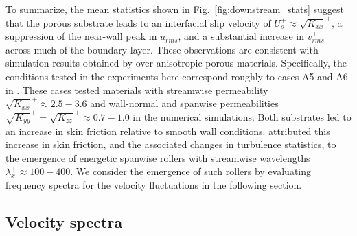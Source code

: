 \documentclass[letterpaper,11pt]{article}
\newcommand{\kpxx}{\sqrt{K_{xx}}^+}
\newcommand{\kpyy}{\sqrt{K_{yy}}^+}
\newcommand{\kpzz}{\sqrt{K_{zz}}^+}
\begin{document}
To summarize, the mean statistics shown in Fig.~\ref{fig:downstream_stats} suggest that the porous substrate leads to an interfacial slip velocity of $U_s^+ \approx \kpxx$, a suppression of the near-wall peak in $u_{rms}^+$, and a substantial increase in $v_{rms}^+$ across much of the boundary layer.  These observations are consistent with simulation results obtained by \citet{gomez2019turbulent} over anisotropic porous materials.  Specifically, the conditions tested in the experiments here correspond roughly to cases A5 and A6 in \citet{gomez2019turbulent}.  These cases tested materials with streamwise permeability $\kpxx \approx 2.5 - 3.6$ and wall-normal and spanwise permeabilities $\kpyy = \kpzz \approx 0.7 - 1.0$ in the numerical simulations. Both substrates led to an increase in skin friction relative to smooth wall conditions. \citet{gomez2019turbulent} attributed this increase in skin friction, and the associated changes in turbulence statistics, to the emergence of energetic spanwise rollers with streamwise wavelengths $\lambda_x^+ \approx 100-400$.  We consider the emergence of such rollers by evaluating frequency spectra for the velocity fluctuations in the following section. 


\subsection{Velocity spectra}\label{sec:pod-spectra}
\end{document}
